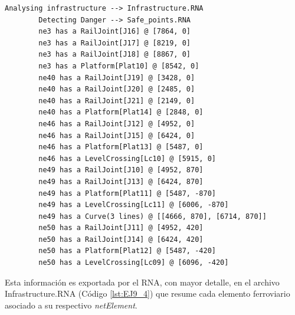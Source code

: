 	\begin{lstlisting}[language = {}, caption = Detección de puntos críticos por parte del RNA , label = {lst:EJ9_2}]
		Analysing infrastructure --> Infrastructure.RNA
		Detecting Danger --> Safe_points.RNA
		ne3 has a RailJoint[J16] @ [7864, 0]
		ne3 has a RailJoint[J17] @ [8219, 0]
		ne3 has a RailJoint[J18] @ [8867, 0]
		ne3 has a Platform[Plat10] @ [8542, 0]
		ne40 has a RailJoint[J19] @ [3428, 0]
		ne40 has a RailJoint[J20] @ [2485, 0]
		ne40 has a RailJoint[J21] @ [2149, 0]
		ne40 has a Platform[Plat14] @ [2848, 0]
		ne46 has a RailJoint[J12] @ [4952, 0]
		ne46 has a RailJoint[J15] @ [6424, 0]
		ne46 has a Platform[Plat13] @ [5487, 0]
		ne46 has a LevelCrossing[Lc10] @ [5915, 0]
		ne49 has a RailJoint[J10] @ [4952, 870]
		ne49 has a RailJoint[J13] @ [6424, 870]
		ne49 has a Platform[Plat11] @ [5487, -870]
		ne49 has a LevelCrossing[Lc11] @ [6006, -870]
		ne49 has a Curve(3 lines) @ [[4666, 870], [6714, 870]]
		ne50 has a RailJoint[J11] @ [4952, 420]
		ne50 has a RailJoint[J14] @ [6424, 420]
		ne50 has a Platform[Plat12] @ [5487, -420]
		ne50 has a LevelCrossing[Lc09] @ [6096, -420]
	\end{lstlisting}
	
	Esta información es exportada por el RNA, con mayor detalle, en el archivo Infrastructure.RNA (Código \ref{lst:EJ9_4}) que resume cada elemento ferroviario asociado a su respectivo \textit{netElement}.

